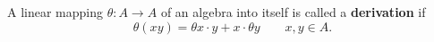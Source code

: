 A linear mapping $\theta: A \to A$ of an algebra into itself is called a \textbf{derivation} if
$$
\theta(xy) = \theta x \cdot y + x \cdot \theta y \qquad x, y \in A.
$$
